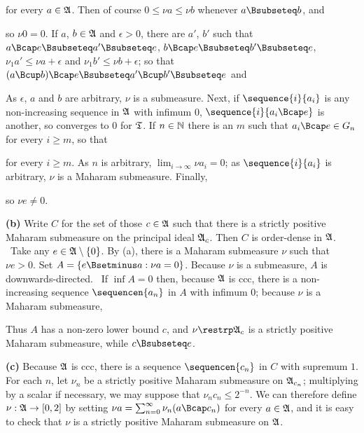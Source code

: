 {

\noindent for every $a\in\frak A$.   Then of course $0\le\nu a\le\nu b$
whenever $a\Bsubseteq b$, and


\noindent so $\nu 0=0$.   If $a$, $b\in\frak A$ and $\epsilon>0$, there
are $a'$, $b'$ such that $a\Bcap e\Bsubseteq a'\Bsubseteq e$,
$b\Bcap e\Bsubseteq b'\Bsubseteq e$, $\nu_1a'\le\nu a+\epsilon$ and
$\nu_1 b'\le\nu b+\epsilon$;  so that
$(a\Bcup b)\Bcap e\Bsubseteq a'\Bcup b'\Bsubseteq e$ and


\noindent As $\epsilon$, $a$ and $b$ are arbitrary, $\nu$ is a
submeasure.   Next, if $\sequence{i}{a_i}$ is any non-increasing
sequence in $\frak A$ with infimum $0$, $\sequence{i}{a_i\Bcap e}$ is
another, so converges to $0$ for $\frak T$.   If $n\in\Bbb N$ there is
an $m$ such that $a_i\Bcap e\in G_n$ for every $i\ge m$, so that


\noindent for every $i\ge m$.   As $n$ is arbitrary,
$\lim_{i\to\infty}\nu a_i=0$;  as $\sequence{i}{a_i}$ is arbitrary,
$\nu$ is a Maharam submeasure.   Finally,


\noindent so $\nu e\ne 0$.\ \Qed

\medskip

{\bf (b)} Write $C$ for the set of those $c\in\frak A$ such that
there is a strictly positive Maharam submeasure on the principal ideal
$\frak A_c$.   Then $C$ is order-dense in $\frak A$.  \Prf\ Take any
$e\in\frak A\setminus\{0\}$.   By (a), there is a
Maharam submeasure $\nu$ such that $\nu e>0$.   Set
$A=\{e\Bsetminus a:\nu a=0\}$.   Because $\nu$ is a submeasure, $A$ is
downwards-directed.
\Quer\ If $\inf A=0$ then, because $\frak A$ is ccc, there is a
non-increasing sequence
$\sequencen{a_n}$ in $A$ with infimum $0$;  because
$\nu$ is a Maharam submeasure,


\noindent Thus $A$ has a non-zero lower bound $c$, and
$\nu\restrp\frak A_c$ is a strictly positive Maharam submeasure, while
$c\Bsubseteq e$.\ \Qed

\medskip

{\bf (c)} Because $\frak A$ is ccc, there is a sequence
$\sequencen{c_n}$ in $C$ with supremum $1$.   For each $n$, let $\nu_n$
be a strictly positive Maharam submeasure on $\frak A_{c_n}$;
multiplying by a scalar if necessary, we may suppose that
$\nu_nc_n\le 2^{-n}$.   We can therefore define $\nu:\frak A\to[0,2]$ by
setting $\nu a=\sum_{n=0}^{\infty}\nu_n(a\Bcap c_n)$ for every
$a\in\frak A$, and it is easy to check that $\nu$ is a strictly positive
Maharam submeasure on $\frak A$.
}%

